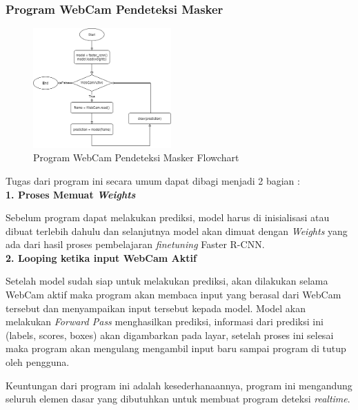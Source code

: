 \documentclass{article}
\begin{document}
	\subsubsection{Program WebCam Pendeteksi Masker}
	\begin{figure}[H]
  		\centering
  		\includegraphics[width=200px]{arsitektur/Sequential Model.png}
  		\caption{Program WebCam Pendeteksi Masker Flowchart}
	\end{figure}
	Tugas dari program ini secara umum dapat dibagi menjadi 2 bagian : \\
	{\textbf{1. Proses Memuat \textit{Weights}}}
	\par Sebelum program dapat melakukan prediksi, model harus di inisialisasi atau dibuat terlebih dahulu dan selanjutnya model akan dimuat dengan \textit{Weights} yang ada dari hasil proses pembelajaran \textit{finetuning} Faster R-CNN.\\
	{\textbf{2. Looping ketika input WebCam Aktif}}
	\par Setelah model sudah siap untuk melakukan prediksi, akan dilakukan selama WebCam aktif maka program akan membaca input yang berasal dari WebCam tersebut dan menyampaikan input tersebut kepada model. Model akan melakukan \textit{Forward Pass} menghasilkan prediksi, informasi dari prediksi ini (labels, scores, boxes) akan digambarkan pada layar, setelah proses ini selesai maka program akan mengulang mengambil input baru sampai program di tutup oleh pengguna.\\
	\par Keuntungan dari program ini adalah kesederhanaannya, program ini mengandung seluruh elemen dasar yang dibutuhkan untuk membuat program deteksi \textit{realtime}.
\end{document}
